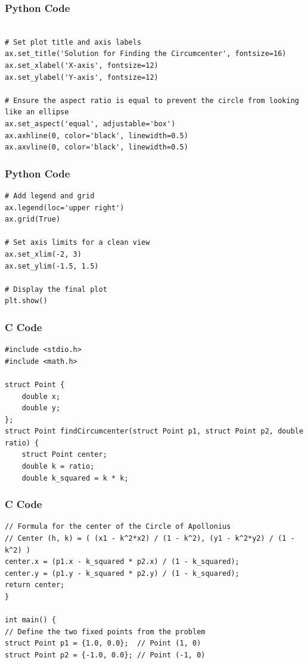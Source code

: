 \documentclass{beamer}
\begin{document}
\begin{frame}[fragile]
\frametitle{Python Code}
\begin{lstlisting}

# Set plot title and axis labels
ax.set_title('Solution for Finding the Circumcenter', fontsize=16)
ax.set_xlabel('X-axis', fontsize=12)
ax.set_ylabel('Y-axis', fontsize=12)

# Ensure the aspect ratio is equal to prevent the circle from looking like an ellipse
ax.set_aspect('equal', adjustable='box')
ax.axhline(0, color='black', linewidth=0.5)
ax.axvline(0, color='black', linewidth=0.5)
\end{lstlisting}
\end{frame}

\begin{frame}[fragile]
\frametitle{Python Code}
\begin{lstlisting}
# Add legend and grid
ax.legend(loc='upper right')
ax.grid(True)

# Set axis limits for a clean view
ax.set_xlim(-2, 3)
ax.set_ylim(-1.5, 1.5)

# Display the final plot
plt.show()
\end{lstlisting}
\end{frame}

\begin{frame}[fragile]
\frametitle{C Code}
\begin{lstlisting}
#include <stdio.h>
#include <math.h>

struct Point {
    double x;
    double y;
};
struct Point findCircumcenter(struct Point p1, struct Point p2, double ratio) {
    struct Point center;
    double k = ratio;
    double k_squared = k * k;
\end{lstlisting}
\end{frame}

\begin{frame}[fragile]
\frametitle{C Code}
\begin{lstlisting}
// Formula for the center of the Circle of Apollonius
// Center (h, k) = ( (x1 - k^2*x2) / (1 - k^2), (y1 - k^2*y2) / (1 - k^2) )
center.x = (p1.x - k_squared * p2.x) / (1 - k_squared);
center.y = (p1.y - k_squared * p2.y) / (1 - k_squared);
return center;
}

int main() {
// Define the two fixed points from the problem
struct Point p1 = {1.0, 0.0};  // Point (1, 0)
struct Point p2 = {-1.0, 0.0}; // Point (-1, 0)
\end{lstlisting}
\end{frame}
\end{document}
